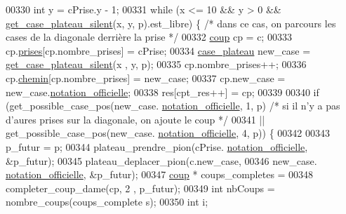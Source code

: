 \begin{DoxyCode}
00330                         \textcolor{keywordtype}{int} y = cPrise.y - 1;
00331                         \textcolor{keywordflow}{while} (x <= 10 && y > 0 && \hyperlink{plateau_8h_a60a8f706865d0ae9087f8d65d4667655}{get_case_plateau_silent}(x, y, 
      p).est\_libre) \{ \textcolor{comment}{/* dans ce cas, on parcours les cases de la diagonale derrière la
       prise */}
00332                                 \hyperlink{structcoup}{coup} cp = c;
00333                                 cp.\hyperlink{structcoup_ae19b3a66d3f4e66b8f69a38e4005f44a}{prises}[cp.nombre\_prises] = cPrise;
00334                                 \hyperlink{structcase__plateau}{case_plateau} new\_case = \hyperlink{plateau_8h_a60a8f706865d0ae9087f8d65d4667655}{get_case_plateau_silent}(x
      , y, p);
00335                                 cp.nombre\_prises++;
00336                                 cp.\hyperlink{structcoup_aa66b88eb8140c2f459ac92fad0796510}{chemin}[cp.nombre\_prises] = new\_case;
00337                                 cp.new\_case = new\_case.\hyperlink{structcase__plateau_ad510581b324604a9cf685cbb769a421a}{notation_officielle};
00338                                 res[cpt\_res++] = cp;
00339 
00340                                 \textcolor{keywordflow}{if} (get\_possible\_case\_pos(new\_case.
      \hyperlink{structcase__plateau_ad510581b324604a9cf685cbb769a421a}{notation_officielle}, 1, p) \textcolor{comment}{/* si il n'y a pas d'aures prises sur la diagonale, on
       ajoute le coup */}
00341                                 || get\_possible\_case\_pos(new\_case.
      \hyperlink{structcase__plateau_ad510581b324604a9cf685cbb769a421a}{notation_officielle}, 4, p)) \{
00342 
00343                                         p\_futur = p;
00344                                         plateau\_prendre\_pion(cPrise.
      \hyperlink{structcase__plateau_ad510581b324604a9cf685cbb769a421a}{notation_officielle}, &p\_futur);
00345                                         plateau\_deplacer\_pion(c.new\_case,
00346                                                         new\_case.
      \hyperlink{structcase__plateau_ad510581b324604a9cf685cbb769a421a}{notation_officielle}, &p\_futur);
00347                                         \hyperlink{structcoup}{coup} * coups\_completes =
00348                                                         completer\_coup\_dame(cp, 2
      , p\_futur);
00349                                         \textcolor{keywordtype}{int} nbCoups = nombre\_coups(coups\_complete
      s);
00350                                         \textcolor{keywordtype}{int} i;

\end{DoxyCode}
